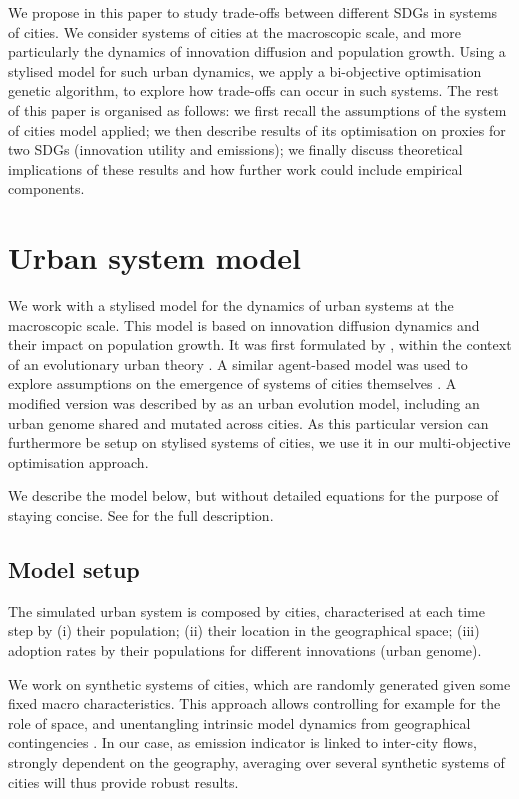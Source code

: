 \documentclass{article}
\begin{document}
We propose in this paper to study trade-offs between different SDGs in systems of cities. We consider systems of cities at the macroscopic scale, and more particularly the dynamics of innovation diffusion and population growth. Using a stylised model for such urban dynamics, we apply a bi-objective optimisation genetic algorithm, to explore how trade-offs can occur in such systems. The rest of this paper is organised as follows: we first recall the assumptions of the system of cities model applied; we then describe results of its optimisation on proxies for two SDGs (innovation utility and emissions); we finally discuss theoretical implications of these results and how further work could include empirical components.



\section{Urban system model}

We work with a stylised model for the dynamics of urban systems at the macroscopic scale. This model is based on innovation diffusion dynamics and their impact on population growth. It was first formulated by \cite{favaro2011gibrat}, within the context of an evolutionary urban theory \cite{pumain1997pour}. A similar agent-based model was used to explore assumptions on the emergence of systems of cities themselves \cite{schmitt2015half}. A modified version was described by \cite{raimbault2020model} as an urban evolution model, including an urban genome shared and mutated across cities. As this particular version can furthermore be setup on stylised systems of cities, we use it in our multi-objective optimisation approach.

We describe the model below, but without detailed equations for the purpose of staying concise. See \cite{raimbault2020model} for the full description.


\subsection{Model setup}

The simulated urban system is composed by cities, characterised at each time step by (i) their population; (ii) their location in the geographical space; (iii) adoption rates by their populations for different innovations (urban genome).

We work on synthetic systems of cities, which are randomly generated given some fixed macro characteristics. This approach allows controlling for example for the role of space, and unentangling intrinsic model dynamics from geographical contingencies \cite{raimbault2019space}. In our case, as emission indicator is linked to inter-city flows, strongly dependent on the geography, averaging over several synthetic systems of cities will thus provide robust results.
\end{document}
